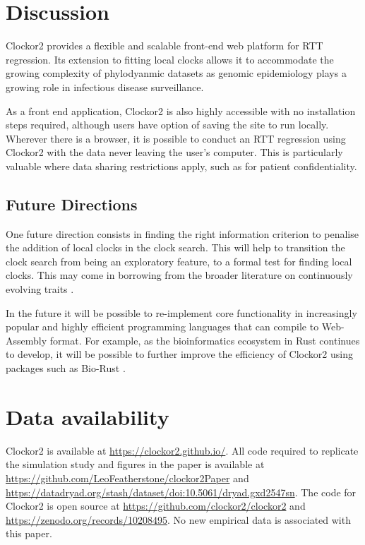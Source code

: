 \documentclass{article}
\begin{document}
\section*{Discussion}
Clockor2 provides a flexible and scalable front-end web platform for RTT regression. Its extension to fitting local clocks allows it to accommodate the growing complexity of phylodyanmic datasets as genomic epidemiology plays a growing role in infectious disease surveillance. 

As a front end application, Clockor2 is also highly accessible with no installation steps required, although users have option of saving the site to run locally. Wherever there is a browser, it is possible to conduct an RTT regression using Clockor2 with the data never leaving the user's computer. {This is particularly valuable where data sharing restrictions apply, such as for patient confidentiality.}

\subsection*{Future Directions}
{One future direction consists in finding the right information criterion to penalise the addition of local clocks in the clock search. This will help to transition the clock search from being an exploratory feature, to a formal test for finding local clocks. This may come in borrowing from the broader literature on continuously evolving traits \citep{bastide_2017_detection,khabbazian_2016_fast}.}

In the future it will be possible to re-implement core functionality in increasingly popular and highly efficient programming languages that can compile to Web-Assembly format. For example, as the bioinformatics ecosystem in Rust continues to develop, it will be possible to further improve the efficiency of Clockor2 using packages such as Bio-Rust \citep{koester_rust-bio-2015}.

\section*{Data availability}
{Clockor2 is available at \url{https://clockor2.github.io/}}. All code required to replicate the simulation study and figures in the paper is available at \url{https://github.com/LeoFeatherstone/clockor2Paper} and \url{https://datadryad.org/stash/dataset/doi:10.5061/dryad.gxd2547sn}. The code for Clockor2 is open source at \url{https://github.com/clockor2/clockor2} and \url{https://zenodo.org/records/10208495}. No new empirical data is associated with this paper.
\end{document}
